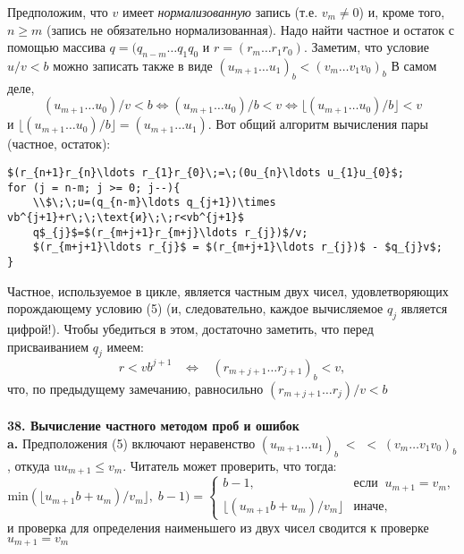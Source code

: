 Предположим, что $v$ имеет \textit{нормализованную } запись (т.е. $v_{m} \neq 0$)
и, кроме того, $n \geqslant m$ (запись не обязательно нормализованная). Надо
найти частное и остаток с помощью массива $q = (q_{n-m}\ldots q_{1}q_{0}$ и $r = (r_{m}\ldots r_{1}r_{0})$. Заметим, что условие $u/v < b$ можно записать также в
виде $(u_{m+1}\ldots u_{1})_{b}<(v_{m}\ldots v_{1}v_{0})_{b}$ В самом деле,
$$(u_{m+1}\ldots u_{0})/v<b \Leftrightarrow (u_{m+1}\ldots u_{0})/b<v \Leftrightarrow \lfloor(u_{m+1}\ldots u_{0})/b\rfloor<v$$
\newpage
\noindent и $\lfloor(u_{m+1}\ldots u_{0})/b\rfloor=(u_{m+1}\ldots u_{1})$. Вот общий алгоритм вычисления пары (частное, остаток):

\begin{leftbar}
\begin{lstlisting}[frame=none, mathescape=true]
$(r_{n+1}r_{n}\ldots r_{1}r_{0}\;=\;(0u_{n}\ldots u_{1}u_{0}$;
for (j = n-m; j >= 0; j--){
	\\$\;\;u=(q_{n-m}\ldots q_{j+1})\times vb^{j+1}+r\;\;\text{и}\;\;r<vb^{j+1}$
	q$_{j}$=$(r_{m+j+1}r_{m+j}\ldots r_{j})$/v;
	$(r_{m+j+1}\ldots r_{j}$ = $(r_{m+j+1}\ldots r_{j})$ - $q_{j}v$;
}	
\end{lstlisting}
\end{leftbar}
Частное, используемое в цикле, является частным двух чисел, удо­влетворяющих порождающему условию (5) (и, следовательно, каждое
вычисляемое $q_{j}$ является цифрой!). Чтобы убедиться в этом, достаточно заметить, что перед присваиванием $q_{j}$ имеем:
$$ r<vb^{j+1}\;\;\;\Longleftrightarrow\;\;\;(r_{m+j+1}\ldots r_{j+1})_{b}<v,$$
что, по предыдущему замечанию, равносильно $(r_{m+j+1}\ldots r_{j})/v<b$
\\\\
\noindent\textbf{38. Вычисление частного методом проб и ошибок}
\\

\textbf{a.} Предположения (5) включают неравенство $(u_{m+1}\ldots u_{1})_{b}\;<$\linebreak
$<\;(v_{m}\ldots v_{1}v_{0})_{b}$, откуда u$u_{m+1}\leqslant v_{m}$. Читатель может проверить, что
тогда:
$$\text{min}(\lfloor u_{m+1}b+u_{m})/v_{m}\rfloor,\;b-1)=\left\lbrace\begin{array}{ll}
b-1,&\text{если}\;\;u_{m+1}=v_{m},\\
\lfloor(u_{m+1}b+u_{m})/v_{m}\rfloor&\text{иначе,}
\end{array}\right.$$
и проверка для определения наименьшего из двух чисел сводится к про­верке $u_{m+1}=v_{m}$


